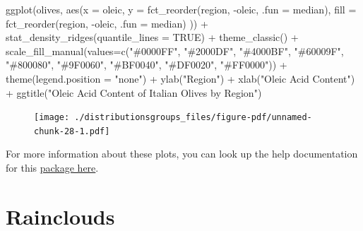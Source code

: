 \documentclass[
  letterpaper,
  DIV=11,
  numbers=noendperiod]{scrreprt}
\newenvironment{Shaded}{\begin{snugshade}}{\end{snugshade}}
\newcommand{\AttributeTok}[1]{\textcolor[rgb]{0.40,0.45,0.13}{#1}}
\newcommand{\ConstantTok}[1]{\textcolor[rgb]{0.56,0.35,0.01}{#1}}
\newcommand{\FunctionTok}[1]{\textcolor[rgb]{0.28,0.35,0.67}{#1}}
\newcommand{\NormalTok}[1]{\textcolor[rgb]{0.00,0.23,0.31}{#1}}
\newcommand{\SpecialCharTok}[1]{\textcolor[rgb]{0.37,0.37,0.37}{#1}}
\newcommand{\StringTok}[1]{\textcolor[rgb]{0.13,0.47,0.30}{#1}}
\begin{document}
\begin{Shaded}
\begin{Highlighting}[]
\FunctionTok{ggplot}\NormalTok{(olives, }\FunctionTok{aes}\NormalTok{(}\AttributeTok{x =}\NormalTok{ oleic, }
                   \AttributeTok{y =} \FunctionTok{fct\_reorder}\NormalTok{(region, }\SpecialCharTok{{-}}\NormalTok{oleic, }\AttributeTok{.fun =}\NormalTok{ median), }
                   \AttributeTok{fill =} \FunctionTok{fct\_reorder}\NormalTok{(region, }\SpecialCharTok{{-}}\NormalTok{oleic, }\AttributeTok{.fun =}\NormalTok{ median)}
\NormalTok{                   )) }\SpecialCharTok{+}
  \FunctionTok{stat\_density\_ridges}\NormalTok{(}\AttributeTok{quantile\_lines =} \ConstantTok{TRUE}\NormalTok{) }\SpecialCharTok{+}
  \FunctionTok{theme\_classic}\NormalTok{() }\SpecialCharTok{+}
  \FunctionTok{scale\_fill\_manual}\NormalTok{(}\AttributeTok{values=}\FunctionTok{c}\NormalTok{(}\StringTok{"\#0000FF"}\NormalTok{, }\StringTok{"\#2000DF"}\NormalTok{, }\StringTok{"\#4000BF"}\NormalTok{, }\StringTok{"\#60009F"}\NormalTok{, }\StringTok{"\#800080"}\NormalTok{, }\StringTok{"\#9F0060"}\NormalTok{, }\StringTok{"\#BF0040"}\NormalTok{, }\StringTok{"\#DF0020"}\NormalTok{, }\StringTok{"\#FF0000"}\NormalTok{)) }\SpecialCharTok{+}
  \FunctionTok{theme}\NormalTok{(}\AttributeTok{legend.position =} \StringTok{"none"}\NormalTok{) }\SpecialCharTok{+}
  \FunctionTok{ylab}\NormalTok{(}\StringTok{"Region"}\NormalTok{) }\SpecialCharTok{+}
  \FunctionTok{xlab}\NormalTok{(}\StringTok{"Oleic Acid Content"}\NormalTok{) }\SpecialCharTok{+}
  \FunctionTok{ggtitle}\NormalTok{(}\StringTok{"Oleic Acid Content of Italian Olives by Region"}\NormalTok{)}
\end{Highlighting}
\end{Shaded}

\begin{figure}[H]

{\centering \texttt{[image: ./distributionsgroups\_files/figure-pdf/unnamed-chunk-28-1.pdf]}

}

\end{figure}

For more information about these plots, you can look up the help
documentation for this
\href{https://cran.r-project.org/web/packages/ggridges/vignettes/introduction.html}{package
here}.


\hypertarget{rainclouds}{%
\chapter{Rainclouds}\label{rainclouds}}
\end{document}

